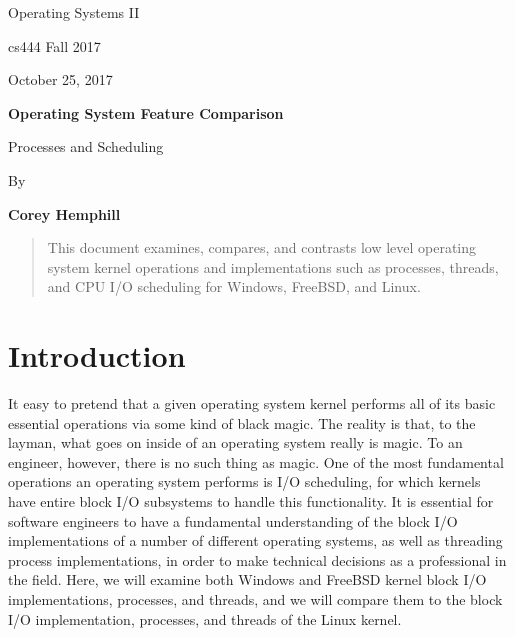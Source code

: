 \documentclass[letterpaper,10pt,draftclsnofoot,onecolumn]{IEEEtran}
\def \Author{Corey Hemphill}
\def \Title{Operating System Feature Comparison}
\def \Subtitle{Processes and Scheduling}
\def \Term{cs444 Fall 2017}
\def \DueDate{October 25, 2017}
\def \DocType{
	Operating Systems II
}
\begin{document}
\begin{titlepage}
    \begin{singlespace}
        \hfill  
        \par\vspace{.2in}
        \centering
        \scshape{
            \huge  \DocType \par
           	\huge \Term \par
            {\large \DueDate}\par
            \vspace{.5in}
            \textbf{\Huge \Title}\par
            {\large \Subtitle}\par
            \vspace{.5in}
           
            {\large By }\par
           	\textbf{\Author}\par
   
            \vspace{5pt}
            }
            \vspace{120pt}
        
        \begin{abstract}
        This document examines, compares, and contrasts low level operating system kernel operations and implementations such as processes, threads, and CPU I/O scheduling for Windows, FreeBSD, and Linux.
        \end{abstract} 
        
    \end{singlespace}
\end{titlepage}
\newpage

\section{Introduction}
It easy to pretend that a given operating system kernel performs all of its basic essential operations via some kind of black magic. The reality is that, to the layman, what goes on inside of an operating system really is magic. To an engineer, however, there is no such thing as magic. One of the most fundamental operations an operating system performs is I/O scheduling, for which kernels have entire block I/O subsystems to handle this functionality. It is essential for software engineers to have a fundamental understanding of the block I/O implementations of a number of different operating systems, as well as threading process implementations, in order to make technical decisions as a professional in the field. Here, we will examine both Windows and FreeBSD kernel block I/O implementations, processes, and threads, and we will compare them to the block I/O implementation, processes, and threads of the Linux kernel.\\
\end{document}

